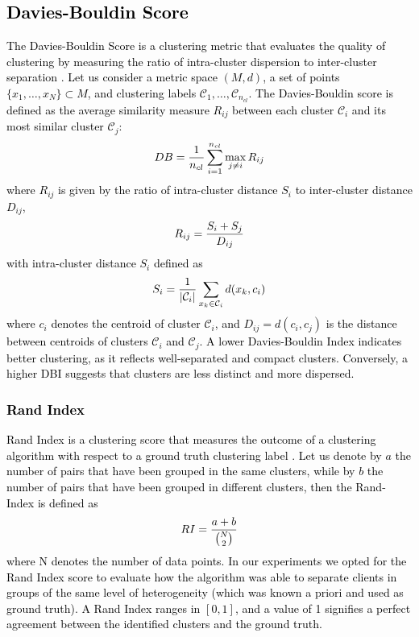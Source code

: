 \subsection{\textcolor{black}{Davies-Bouldin Score}}
\textcolor{black}{The Davies-Bouldin Score is a clustering metric that evaluates the quality of clustering by measuring the ratio of intra-cluster dispersion to inter-cluster separation \citep{davies1979cluster}. Let us consider a metric space $(M,d)$, a set of points $\{x_1, \dots, x_N\} \subset M$, and clustering labels $\mathcal{C}_1, \dots, \mathcal{C}_{n_{cl}}$. The Davies-Bouldin score is defined as the average similarity measure $R_{ij}$ between each cluster $\mathcal{C}_i$ and its most similar cluster $\mathcal{C}_j$}:
\begin{equation}\label{db_index_defn1}
    \color{black}
    DB = \dfrac{1}{n_{cl}} \sum_{i=1}^{n_{cl}} \max_{j \neq i} R_{ij}
\end{equation}
\textcolor{black}{where $R_{ij}$ is given by the ratio of intra-cluster distance $S_i$ to inter-cluster distance $D_{ij}$, \ie}
\begin{equation}\label{db_index_defn}
    \color{black}
    R_{ij} = \dfrac{S_i + S_j}{D_{ij}}
\end{equation}
\textcolor{black}{with intra-cluster distance $S_i$ defined as}
\begin{equation}
    \color{black}
    S_i = \dfrac{1}{|\mathcal{C}_i|} \sum_{x_k \in \mathcal{C}_i} d(x_k, c_i)
\end{equation}
\textcolor{black}{where $c_i$ denotes the centroid of cluster $\mathcal{C}_i$, and $D_{ij} = d(c_i, c_j)$ is the distance between centroids of clusters $\mathcal{C}_i$ and $\mathcal{C}_j$. A lower Davies-Bouldin Index indicates better clustering, as it reflects well-separated and compact clusters. Conversely, a higher DBI suggests that clusters are less distinct and more dispersed.}
\subsubsection{\textcolor{black}{Rand Index}} \textcolor{black}{Rand Index is a clustering score that measures the outcome of a clustering algorithm with respect to a ground truth clustering label \citep{rand1971objective}. Let us denote by $a$ the number of pairs that have been grouped in the same clusters, while by $b$ the number of pairs that have been grouped in different clusters, then the Rand-Index is defined as}
\begin{equation}
    \color{black}
    RI = \dfrac{a + b}{\binom{N}{2}}
\end{equation}
\textcolor{black}{where N denotes the number of data points. In our experiments we opted for the Rand Index score to evaluate how the algorithm was able to separate clients in groups of the same level of heterogeneity (which was known a priori and used as ground truth). A Rand Index ranges in $[0,1]$, and a value of 1 signifies a perfect agreement between the identified clusters and the ground truth.}
